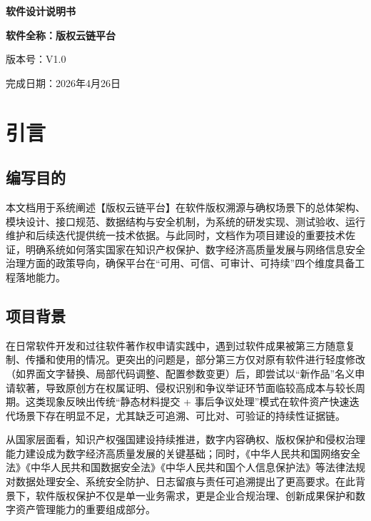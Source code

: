 \documentclass[UTF8,a4paper,12pt]{ctexart}
\begin{document}
\songti
{}

\begin{titlepage}
  \centering
  \vspace*{2.5cm}
  {\songti{}\bfseries 软件设计说明书\par}
  \vspace{1.1cm}
  {\songti{}\bfseries 软件全称：版权云链平台\par}
  \vspace{0.5cm}
  {\songti{}版本号：V1.0\par}
  \vspace{2.2cm}

  \begin{center}
    \songti{}
    完成日期：2026年4月26日
  \end{center}

  \vfill
\end{titlepage}

\newpage
{}
\tableofcontents
\newpage
{}
\setcounter{page}{1}

\section{引言}
\subsection{编写目的}
本文档用于系统阐述【版权云链平台】在软件版权溯源与确权场景下的总体架构、模块设计、接口规范、数据结构与安全机制，为系统的研发实现、测试验收、运行维护和后续迭代提供统一技术依据。与此同时，文档作为项目建设的重要技术佐证，明确系统如何落实国家在知识产权保护、数字经济高质量发展与网络信息安全治理方面的政策导向，确保平台在“可用、可信、可审计、可持续”四个维度具备工程落地能力。

\subsection{项目背景}
在日常软件开发和过往软件著作权申请实践中，遇到过软件成果被第三方随意复制、传播和使用的情况。更突出的问题是，部分第三方仅对原有软件进行轻度修改（如界面文字替换、局部代码调整、配置参数变更）后，即尝试以“新作品”名义申请软著，导致原创方在权属证明、侵权识别和争议举证环节面临较高成本与较长周期。这类现象反映出传统“静态材料提交 + 事后争议处理”模式在软件资产快速迭代场景下存在明显不足，尤其缺乏可追溯、可比对、可验证的持续性证据链。

从国家层面看，知识产权强国建设持续推进，数字内容确权、版权保护和侵权治理能力建设成为数字经济高质量发展的关键基础；同时，《中华人民共和国网络安全法》《中华人民共和国数据安全法》《中华人民共和国个人信息保护法》等法律法规对数据处理安全、系统安全防护、日志留痕与责任可追溯提出了更高要求。在此背景下，软件版权保护不仅是单一业务需求，更是企业合规治理、创新成果保护和数字资产管理能力的重要组成部分。
\end{document}
